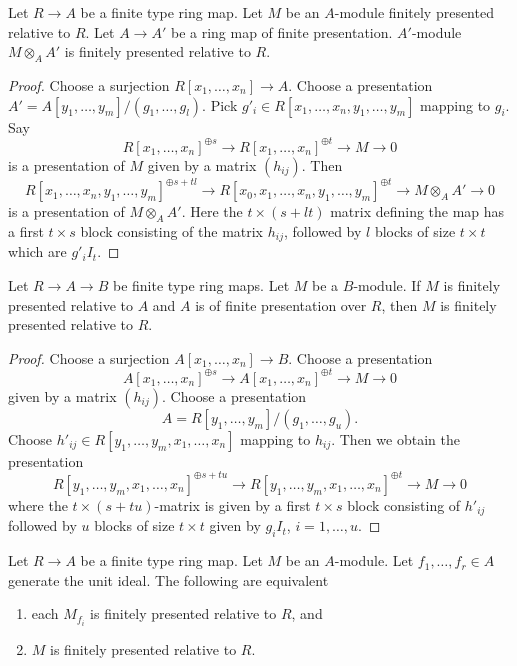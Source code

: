 \begin{lemma}
\label{lemma-pull-relative-finite-presentation}
Let $R \to A$ be a finite type ring map.
Let $M$ be an $A$-module finitely presented relative to $R$.
Let $A \to A'$ be a ring map of finite presentation.
$A'$-module $M \otimes_A A'$ is finitely presented relative to $R$.
\end{lemma}

\begin{proof}
Choose a surjection $R[x_1, \ldots, x_n] \to A$. Choose a presentation
$A' = A[y_1, \ldots, y_m]/(g_1, \ldots, g_l)$.
Pick $g'_i \in R[x_1, \ldots, x_n, y_1, \ldots, y_m]$ mapping to $g_i$.
Say
$$
R[x_1, \ldots, x_n]^{\oplus s} \to
R[x_1, \ldots, x_n]^{\oplus t} \to M \to 0
$$
is a presentation of $M$ given by a matrix $(h_{ij})$.
Then
$$
R[x_1, \ldots, x_n, y_1, \ldots, y_m]^{\oplus s + tl} \to
R[x_0, x_1, \ldots, x_n, y_1, \ldots, y_m]^{\oplus t} \to M \otimes_A A' \to 0
$$
is a presentation of $M \otimes_A A'$.
Here the $t \times (s + lt)$ matrix defining the map has a first
$t \times s$ block consisting of the matrix $h_{ij}$, followed
by $l$ blocks of size $t \times t$ which are $g'_iI_t$.
\end{proof}

\begin{lemma}
\label{lemma-composition-relative-finite-presentation}
Let $R \to A \to B$ be finite type ring maps. Let $M$ be a $B$-module.
If $M$ is finitely presented relative to $A$ and $A$ is of finite presentation
over $R$, then $M$ is finitely presented relative to $R$.
\end{lemma}

\begin{proof}
Choose a surjection $A[x_1, \ldots, x_n] \to B$.
Choose a presentation
$$
A[x_1, \ldots, x_n]^{\oplus s} \to
A[x_1, \ldots, x_n]^{\oplus t} \to M \to 0
$$
given by a matrix $(h_{ij})$. Choose a presentation
$$
A = R[y_1, \ldots, y_m]/(g_1, \ldots, g_u).
$$
Choose $h'_{ij} \in R[y_1, \ldots, y_m, x_1, \ldots, x_n]$
mapping to $h_{ij}$. Then we obtain the presentation
$$
R[y_1, \ldots, y_m, x_1, \ldots, x_n]^{\oplus s + tu} \to
R[y_1, \ldots, y_m, x_1, \ldots, x_n]^{\oplus t} \to M \to 0
$$
where the $t \times (s + tu)$-matrix is given by a first $t \times s$ block
consisting of $h'_{ij}$ followed by $u$ blocks of size $t \times t$ given
by $g_iI_t$, $i = 1, \ldots, u$.
\end{proof}

\begin{lemma}
\label{lemma-glue-relative-finite-presentation}
Let $R \to A$ be a finite type ring map. Let $M$ be an $A$-module.
Let $f_1, \ldots, f_r \in A$ generate the unit ideal.
The following are equivalent
\begin{enumerate}
\item each $M_{f_i}$ is finitely presented relative to $R$, and
\item $M$ is finitely presented relative to $R$.
\end{enumerate}
\end{lemma}

